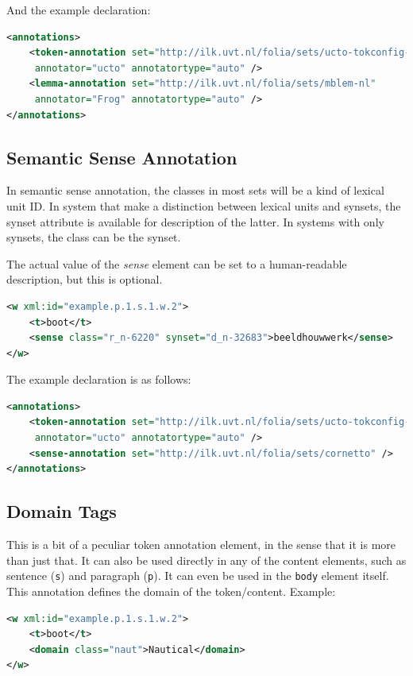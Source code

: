 \documentclass[a4paper,12pt]{report}
\begin{document}
And the example declaration:

\begin{lstlisting}[language=xml]
<annotations>
    <token-annotation set="http://ilk.uvt.nl/folia/sets/ucto-tokconfig-nl" 
     annotator="ucto" annotatortype="auto" />
    <lemma-annotation set="http://ilk.uvt.nl/folia/sets/mblem-nl"
     annotator="Frog" annotatortype="auto" />
</annotations>
\end{lstlisting}


\subsection{Semantic Sense Annotation}

In semantic sense annotation, the classes in most sets will be a kind of lexical unit ID. In system that make a distinction between lexical units and synsets, the synset attribute is available for description of the latter. In systems with only synsets, the class can be the synset.

The actual value of the \emph{sense} element can be set to a human-readable description, but this is optional.

\begin{lstlisting}[language=xml]
<w xml:id="example.p.1.s.1.w.2">
    <t>boot</t>
    <sense class="r_n-6220" synset="d_n-32683">beeldhouwwerk</sense>
</w>
\end{lstlisting}

The example declaration is as follows:

\begin{lstlisting}[language=xml]
<annotations>
    <token-annotation set="http://ilk.uvt.nl/folia/sets/ucto-tokconfig-nl"
     annotator="ucto" annotatortype="auto" />
    <sense-annotation set="http://ilk.uvt.nl/folia/sets/cornetto" />
</annotations>
\end{lstlisting}

\subsection{Domain Tags}

This is a bit of a peculiar token annotation element, in the sense that it is more than just that. It can also be used directly in any of the content elements, such as sentence (\texttt{s}) and  paragraph (\texttt{p}). It can even be used in the \texttt{body} element itself. This annotation defines the domain of the token/content. Example:

\begin{lstlisting}[language=xml]
<w xml:id="example.p.1.s.1.w.2">
    <t>boot</t>
    <domain class="naut">Nautical</domain>
</w>
\end{lstlisting}
\end{document}
